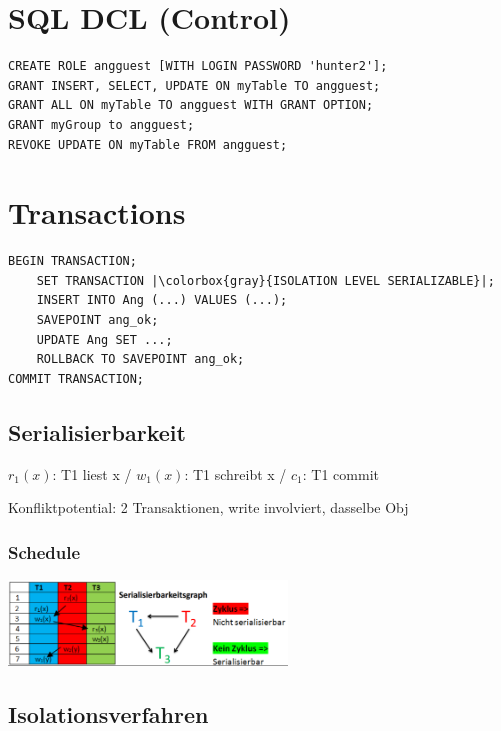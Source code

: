 \begin{multicols*}{3}
\section{SQL DCL (Control)}
\begin{verbatim}
CREATE ROLE angguest [WITH LOGIN PASSWORD 'hunter2'];
GRANT INSERT, SELECT, UPDATE ON myTable TO angguest;
GRANT ALL ON myTable TO angguest WITH GRANT OPTION;
GRANT myGroup to angguest;
REVOKE UPDATE ON myTable FROM angguest;
\end{verbatim}

\section{Transactions}
\begin{verbatim}
BEGIN TRANSACTION;
    SET TRANSACTION |\colorbox{gray}{ISOLATION LEVEL SERIALIZABLE}|;
    INSERT INTO Ang (...) VALUES (...);
    SAVEPOINT ang_ok;
    UPDATE Ang SET ...;
    ROLLBACK TO SAVEPOINT ang_ok;
COMMIT TRANSACTION;
\end{verbatim}


\subsection{Serialisierbarkeit}
$r_{1}(x)$: T1 liest x / $w_{1}(x)$: T1 schreibt x / $c_{1}$: T1 commit

Konfliktpotential: 2 Transaktionen, write involviert, dasselbe Obj

\newcommand{\ta}[2]{{\color{blue}#1_{1}#2}}
\newcommand{\tb}[2]{{\color{red}#1_{2}#2}}
\newcommand{\tc}[2]{{\color{green}#1_{3}#2}}

\subsubsection{Schedule}
\includegraphics[width=20em]{serial.png}

\subsection{Isolationsverfahren}


\end{multicols*}
